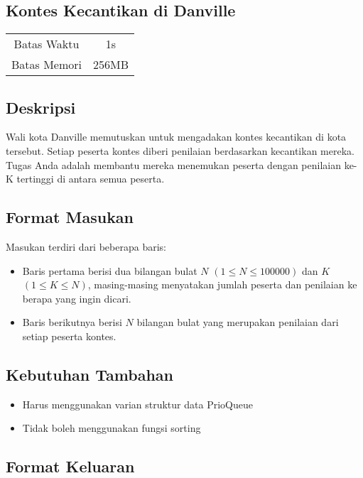 \documentclass{article}
\begin{document}
\begin{center}
    \section*{Kontes Kecantikan di Danville}
    
    \begin{tabular}{ | c c | }
        \hline
        Batas Waktu  & 1s \\ 
        Batas Memori & 256MB \\ 
        \hline
    \end{tabular}
\end{center}

\subsection*{Deskripsi}

Wali kota Danville memutuskan untuk mengadakan kontes kecantikan di kota tersebut. Setiap peserta kontes diberi penilaian berdasarkan kecantikan mereka. Tugas Anda adalah membantu mereka menemukan peserta dengan penilaian ke-K tertinggi di antara semua peserta.

\subsection*{Format Masukan}

Masukan terdiri dari beberapa baris:
\begin{itemize}
    \item Baris pertama berisi dua bilangan bulat $N$ $(1 \leq N \leq 100000)$ dan $K$ $(1 \leq K \leq N)$, masing-masing menyatakan jumlah peserta dan penilaian ke berapa yang ingin dicari.
    \item Baris berikutnya berisi $N$ bilangan bulat yang merupakan penilaian dari setiap peserta kontes.
\end{itemize}

\subsection*{\textbf{Kebutuhan Tambahan}}
\begin{itemize}
    \item Harus menggunakan varian struktur data PrioQueue
    \item Tidak boleh menggunakan fungsi sorting
\end{itemize}

\subsection*{Format Keluaran}
\end{document}
